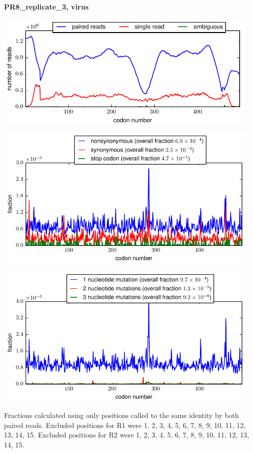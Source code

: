 \documentclass[10pt,letterpaper]{article}
\begin{document}
\centerline{\Large \bf PR8\_replicate\_3, virus}
\vspace{0.1in}

\centerline{\includegraphics[width=5in]{PR8_replicate_3_virus_codondepth.pdf}}
\vspace{0.1in}

\centerline{\includegraphics[width=5in]{PR8_replicate_3_virus_syn-ns-dist.pdf}}
\vspace{0.1in}

\centerline{\includegraphics[width=5in]{PR8_replicate_3_virus_nmutspercodon-dist.pdf}}
\vspace{0.1in}

Fractions calculated using only positions called to the same identity by both paired reads.  Excluded positions for R1 were 1, 2, 3, 4, 5, 6, 7, 8, 9, 10, 11, 12, 13, 14, 15. 
 Excluded positions for R2 were 1, 2, 3, 4, 5, 6, 7, 8, 9, 10, 11, 12, 13, 14, 15. 
\end{document}
